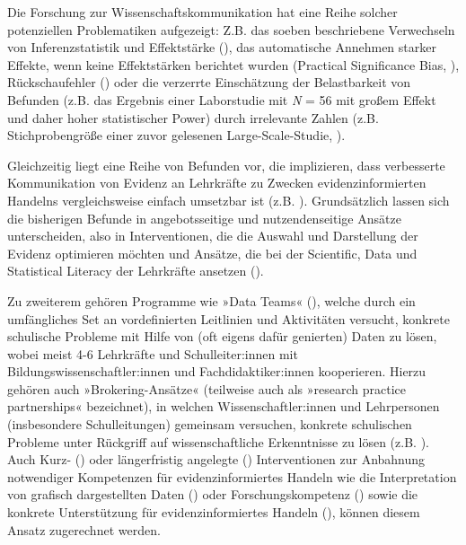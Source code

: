 \documentclass[
  jou,
  floatsintext,
  longtable,
  nolmodern,
  notxfonts,
  notimes,
  colorlinks=true,linkcolor=blue,citecolor=blue,urlcolor=blue]{apa7}
\begin{document}
Die Forschung zur Wissenschaftskommunikation hat eine Reihe solcher
potenziellen Problematiken aufgezeigt: Z.B. das soeben beschriebene
Verwechseln von Inferenzstatistik und Effektstärke
(), das automatische
Annehmen starker Effekte, wenn keine Effektstärken berichtet wurden
(Practical Significance Bias, ), Rückschaufehler () oder die verzerrte Einschätzung der Belastbarkeit von
Befunden (z.B. das Ergebnis einer Laborstudie mit \emph{N} = 56 mit
großem Effekt und daher hoher statistischer Power) durch irrelevante
Zahlen (z.B. Stichprobengröße einer zuvor gelesenen Large-Scale-Studie,
).

Gleichzeitig liegt eine Reihe von Befunden vor, die implizieren, dass
verbesserte Kommunikation von Evidenz an Lehrkräfte zu Zwecken
evidenzinformierten Handelns vergleichsweise einfach umsetzbar ist (z.B.
). Grundsätzlich
lassen sich die bisherigen Befunde in angebotsseitige und
nutzendenseitige Ansätze unterscheiden, also in Interventionen, die die
Auswahl und Darstellung der Evidenz optimieren möchten und Ansätze, die
bei der Scientific, Data und Statistical Literacy der Lehrkräfte
ansetzen ().

Zu zweiterem gehören Programme wie »Data Teams«
(), welche durch
ein umfängliches Set an vordefinierten Leitlinien und Aktivitäten
versucht, konkrete schulische Probleme mit Hilfe von (oft eigens dafür
genierten) Daten zu lösen, wobei meist 4-6 Lehrkräfte und
Schulleiter:innen mit Bildungswissenschaftler:innen und
Fachdidaktiker:innen kooperieren. Hierzu gehören auch
»Brokering-Ansätze« (teilweise auch als »research practice partnerships«
bezeichnet), in welchen Wissenschaftler:innen und Lehrpersonen
(insbesondere Schulleitungen) gemeinsam versuchen, konkrete schulischen
Probleme unter Rückgriff auf wissenschaftliche Erkenntnisse zu lösen
(z.B. ). Auch Kurz-
() oder längerfristig angelegte
() Interventionen zur
Anbahnung notwendiger Kompetenzen für evidenzinformiertes Handeln wie
die Interpretation von grafisch dargestellten Daten
() oder Forschungskompetenz
() sowie die
konkrete Unterstützung für evidenzinformiertes Handeln
(),
können diesem Ansatz zugerechnet werden.
\end{document}

